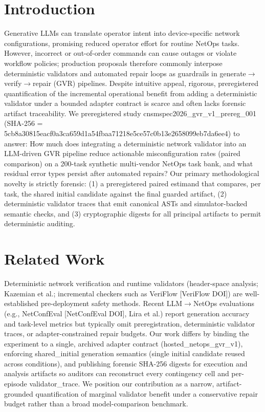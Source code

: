 \documentclass[conference]{IEEEtran}
\begin{document}
\section{Introduction}
Generative LLMs can translate operator intent into device-specific network configurations, promising reduced operator effort for routine NetOps tasks. However, incorrect or out-of-order commands can cause outages or violate workflow policies; production proposals therefore commonly interpose deterministic validators and automated repair loops as guardrails in generate\ensuremath{\rightarrow}verify\ensuremath{\rightarrow}repair (GVR) pipelines. Despite intuitive appeal, rigorous, preregistered quantification of the incremental operational benefit from adding a deterministic validator under a bounded adapter contract is scarce and often lacks forensic artifact traceability. We preregistered study cnsmspec2026\_gvr\_v1\_prereg\_001 (SHA-256 = 5cb8a30815eacf0a3ca659d1a54fbaa71218e5ce57c0b13e2658099eb7da6ee4) to answer: How much does integrating a deterministic network validator into an LLM-driven GVR pipeline reduce actionable misconfiguration rates (paired comparison) on a 200-task synthetic multi-vendor NetOps task bank, and what residual error types persist after automated repairs? Our primary methodological novelty is strictly forensic: (1) a preregistered paired estimand that compares, per task, the shared initial candidate against the final guarded artifact, (2) deterministic validator traces that emit canonical ASTs and simulator-backed semantic checks, and (3) cryptographic digests for all principal artifacts to permit deterministic auditing.

\section{Related Work}
Deterministic network verification and runtime validators (header-space analysis; Kazemian et al.; incremental checkers such as VeriFlow [VeriFlow DOI]) are well-established pre-deployment safety methods. Recent LLM\ensuremath{\rightarrow}NetOps evaluations (e.g., NetConfEval [NetConfEval DOI], Lira et al.) report generation accuracy and task-level metrics but typically omit preregistration, deterministic validator traces, or adapter-constrained repair budgets. Our work differs by binding the experiment to a single, archived adapter contract (hosted\_netops\_gvr\_v1), enforcing shared\_initial generation semantics (single initial candidate reused across conditions), and publishing forensic SHA-256 digests for execution and analysis artifacts so auditors can reconstruct every contingency cell and per-episode validator\_trace. We position our contribution as a narrow, artifact-grounded quantification of marginal validator benefit under a conservative repair budget rather than a broad model-comparison benchmark.
\end{document}
